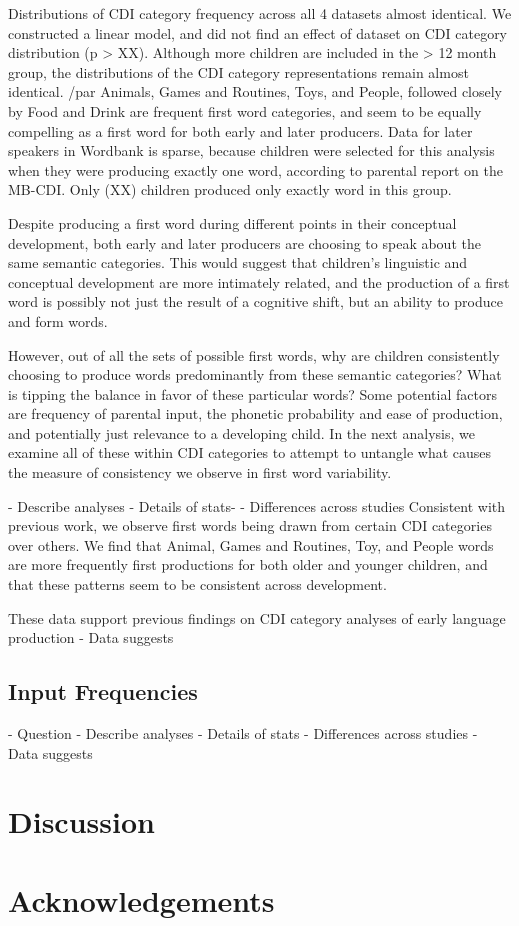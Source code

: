\documentclass[10pt,letterpaper]{article}
\begin{document}
Distributions of CDI category frequency across all 4 datasets almost identical. We constructed a linear model, and did not find an effect of dataset on CDI category distribution (p > XX). Although more children are included in the > 12 month group, the distributions of the CDI category representations remain almost identical. /par 
Animals, Games and Routines, Toys, and People, followed closely by Food and Drink are frequent first word categories, and seem to be equally compelling as a first word for both early and later producers. Data for later speakers in Wordbank is sparse, because children were selected for this analysis when they were producing exactly one word, according to parental report on the MB-CDI. Only (XX) children produced only exactly word in this group. \par 
Despite producing a first word during different points in their conceptual development, both early and later producers are choosing to speak about the same semantic categories. This would suggest that children's linguistic and conceptual development are more intimately related, and the production of a first word is possibly not just the result of a cognitive shift, but an ability to produce and form words. \par
However, out of all the sets of possible first words, why are children consistently choosing to produce words predominantly from these semantic categories? What is tipping the balance in favor of these particular words? Some potential factors are frequency of parental input, the phonetic probability and ease of production, and potentially just relevance to a developing child. In the next analysis, we examine all of these within CDI categories to attempt to untangle what causes the measure of consistency we observe in first word variability.


- Describe analyses
- Details of stats- 
- Differences across studies
Consistent with previous work, we observe first words being drawn from certain CDI categories over others. We find that Animal, Games and Routines, Toy, and People words are more frequently first productions for both older and younger children, and that these patterns seem to be consistent across development. \par
These data support previous findings on CDI category analyses of early language production 
- Data suggests

\subsection{Input Frequencies}
- Question
- Describe analyses
- Details of stats
- Differences across studies
- Data suggests

\section{Discussion}

\section{Acknowledgements}
\end{document}
